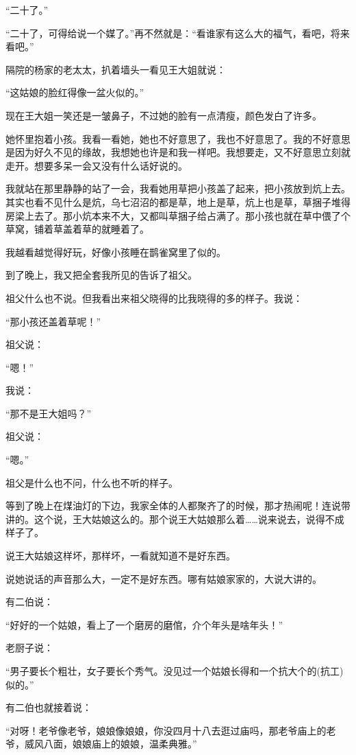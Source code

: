 \par “二十了。”
\par “二十了，可得给说一个媒了。”再不然就是：“看谁家有这么大的福气，看吧，将来看吧。”
\par 隔院的杨家的老太太，扒着墙头一看见王大姐就说：
\par “这姑娘的脸红得像一盆火似的。”
\par 现在王大姐一笑还是一皱鼻子，不过她的脸有一点清瘦，颜色发白了许多。
\par 她怀里抱着小孩。我看一看她，她也不好意思了，我也不好意思了。我的不好意思是因为好久不见的缘故，我想她也许是和我一样吧。我想要走，又不好意思立刻就走开。想要多呆一会又没有什么话好说的。
\par 我就站在那里静静的站了一会，我看她用草把小孩盖了起来，把小孩放到炕上去。其实也看不见什么是炕，乌七沼沼的都是草，地上是草，炕上也是草，草捆子堆得房梁上去了。那小炕本来不大，又都叫草捆子给占满了。那小孩也就在草中偎了个草窝，铺着草盖着草的就睡着了。
\par 我越看越觉得好玩，好像小孩睡在鹊雀窝里了似的。
\par 到了晚上，我又把全套我所见的告诉了祖父。
\par 祖父什么也不说。但我看出来祖父晓得的比我晓得的多的样子。我说：
\par “那小孩还盖着草呢！”
\par 祖父说：
\par “嗯！”
\par 我说：
\par “那不是王大姐吗？”
\par 祖父说：
\par “嗯。”
\par 祖父是什么也不问，什么也不听的样子。
\par 等到了晚上在煤油灯的下边，我家全体的人都聚齐了的时候，那才热闹呢！连说带讲的。这个说，王大姑娘这么的。那个说王大姑娘那么着……说来说去，说得不成样子了。
\par 说王大姑娘这样坏，那样坏，一看就知道不是好东西。
\par 说她说话的声音那么大，一定不是好东西。哪有姑娘家家的，大说大讲的。
\par 有二伯说：
\par “好好的一个姑娘，看上了一个磨房的磨倌，介个年头是啥年头！”
\par 老厨子说：
\par “男子要长个粗壮，女子要长个秀气。没见过一个姑娘长得和一个抗大个的(抗工)似的。”
\par 有二伯也就接着说：
\par “对呀！老爷像老爷，娘娘像娘娘，你没四月十八去逛过庙吗，那老爷庙上的老爷，威风八面，娘娘庙上的娘娘，温柔典雅。”
